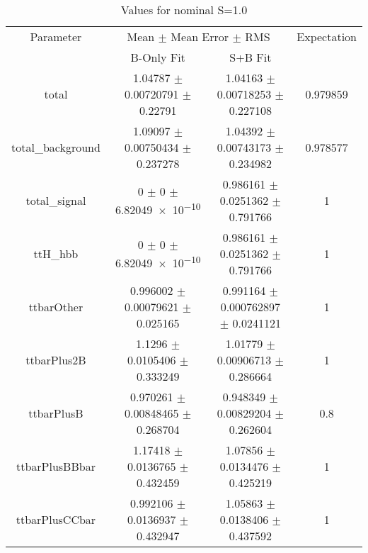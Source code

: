 \begin{table}
\centering
\caption{Values for nominal S=1.0}
\begin{tabular}{cccc}
\toprule
Parameter & \multicolumn{2}{c}{Mean $\pm$ Mean Error $\pm$ RMS} & Expectation\\
 & B-Only Fit & S+B Fit & \\
\midrule
total & \num{1.04787} $\pm$ \num{0.00720791} $\pm$ \num{0.22791} & \num{1.04163} $\pm$ \num{0.00718253} $\pm$ \num{0.227108} & \num{0.979859}\\
total\_background & \num{1.09097} $\pm$ \num{0.00750434} $\pm$ \num{0.237278} & \num{1.04392} $\pm$ \num{0.00743173} $\pm$ \num{0.234982} & \num{0.978577}\\
total\_signal & \num{0} $\pm$ \num{0} $\pm$ \num{6.82049e-10} & \num{0.986161} $\pm$ \num{0.0251362} $\pm$ \num{0.791766} & \num{1}\\
ttH\_hbb & \num{0} $\pm$ \num{0} $\pm$ \num{6.82049e-10} & \num{0.986161} $\pm$ \num{0.0251362} $\pm$ \num{0.791766} & \num{1}\\
ttbarOther & \num{0.996002} $\pm$ \num{0.00079621} $\pm$ \num{0.025165} & \num{0.991164} $\pm$ \num{0.000762897} $\pm$ \num{0.0241121} & \num{1}\\
ttbarPlus2B & \num{1.1296} $\pm$ \num{0.0105406} $\pm$ \num{0.333249} & \num{1.01779} $\pm$ \num{0.00906713} $\pm$ \num{0.286664} & \num{1}\\
ttbarPlusB & \num{0.970261} $\pm$ \num{0.00848465} $\pm$ \num{0.268704} & \num{0.948349} $\pm$ \num{0.00829204} $\pm$ \num{0.262604} & \num{0.8}\\
ttbarPlusBBbar & \num{1.17418} $\pm$ \num{0.0136765} $\pm$ \num{0.432459} & \num{1.07856} $\pm$ \num{0.0134476} $\pm$ \num{0.425219} & \num{1}\\
ttbarPlusCCbar & \num{0.992106} $\pm$ \num{0.0136937} $\pm$ \num{0.432947} & \num{1.05863} $\pm$ \num{0.0138406} $\pm$ \num{0.437592} & \num{1}\\
\bottomrule
\end{tabular}
\end{table}